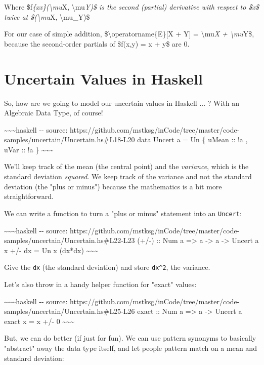 \documentclass[]{article}
\begin{document}
Where \$f\emph{\{xx\}(\textbackslash{}mu}X, \textbackslash{}mu\emph{Y)\$ is the
second (partial) derivative with respect to \$x\$ twice at
\$(\textbackslash{}mu}X, \textbackslash{}mu\_Y)\$

For our case of simple addition, \$\textbackslash{}operatorname\{E\}{[}X + Y{]}
= \textbackslash{}mu\emph{X + \textbackslash{}mu}Y\$, because the second-order
partials of \$f(x,y) = x + y\$ are 0.

\section{Uncertain Values in Haskell}

So, how are we going to model our uncertain values in Haskell ... ? With an
Algebraic Data Type, of course!

\textasciitilde{}\textasciitilde{}\textasciitilde{}haskell -\/- source:
https://github.com/mstksg/inCode/tree/master/code-samples/uncertain/Uncertain.hs\#L18-L20
data Uncert a = Un \{ uMean :: !a , uVar :: !a \}
\textasciitilde{}\textasciitilde{}\textasciitilde{}

We'll keep track of the mean (the central point) and the \emph{variance}, which
is the standard deviation \emph{squared}. We keep track of the variance and not
the standard deviation (the "plus or minus") because the mathematics is a bit
more straightforward.

We can write a function to turn a "plus or minus" statement into an
\texttt{Uncert}:

\textasciitilde{}\textasciitilde{}\textasciitilde{}haskell -\/- source:
https://github.com/mstksg/inCode/tree/master/code-samples/uncertain/Uncertain.hs\#L22-L23
(+/-) :: Num a =\textgreater{} a -\textgreater{} a -\textgreater{} Uncert a x
+/- dx = Un x (dx*dx) \textasciitilde{}\textasciitilde{}\textasciitilde{}

Give the \texttt{dx} (the standard deviation) and store \texttt{dx\^{}2}, the
variance.

Let's also throw in a handy helper function for "exact" values:

\textasciitilde{}\textasciitilde{}\textasciitilde{}haskell -\/- source:
https://github.com/mstksg/inCode/tree/master/code-samples/uncertain/Uncertain.hs\#L25-L26
exact :: Num a =\textgreater{} a -\textgreater{} Uncert a exact x = x +/- 0
\textasciitilde{}\textasciitilde{}\textasciitilde{}

But, we can do better (if just for fun). We can use pattern synonyms to
basically "abstract" away the data type itself, and let people pattern match on
a mean and standard deviation:
\end{document}
